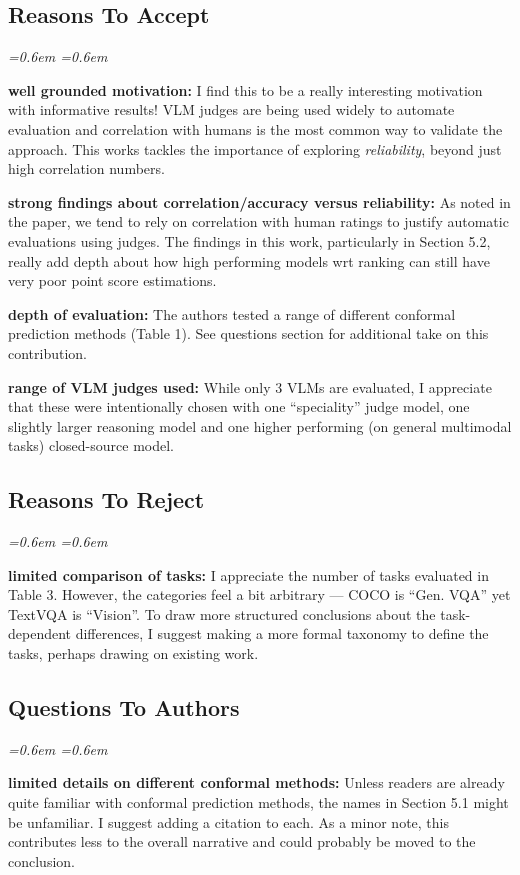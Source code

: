 \documentclass[10pt]{article}
\newenvironment{reviewerquote}{%
  \par\addvspace{0.25ex}\begingroup
  \footnotesize\itshape
  \leftskip=0.6em \rightskip=0.6em
  \color{black!78}
  \setlength{\parskip}{0.35ex plus 0.1ex}
}{%
  \endgroup\par\addvspace{0.25ex}
}
\begin{document}
\subsection*{Reasons To Accept}
\begin{reviewerquote}
\textbf{well grounded motivation:} I find this to be a really interesting motivation with informative results! VLM judges are being used widely to automate evaluation and correlation with humans is the most common way to validate the approach. This works tackles the importance of exploring \emph{reliability}, beyond just high correlation numbers.

\textbf{strong findings about correlation/accuracy versus reliability:} As noted in the paper, we tend to rely on correlation with human ratings to justify automatic evaluations using judges. The findings in this work, particularly in Section 5.2, really add depth about how high performing models wrt ranking can still have very poor point score estimations.

\textbf{depth of evaluation:} The authors tested a range of different conformal prediction methods (Table 1). See questions section for additional take on this contribution.

\textbf{range of VLM judges used:} While only 3 VLMs are evaluated, I appreciate that these were intentionally chosen with one ``speciality'' judge model, one slightly larger reasoning model and one higher performing (on general multimodal tasks) closed-source model.
\end{reviewerquote}

\subsection*{Reasons To Reject}
\begin{reviewerquote}
\textbf{limited comparison of tasks:} I appreciate the number of tasks evaluated in Table 3. However, the categories feel a bit arbitrary --- COCO is ``Gen. VQA'' yet TextVQA is ``Vision''. To draw more structured conclusions about the task-dependent differences, I suggest making a more formal taxonomy to define the tasks, perhaps drawing on existing work.
\end{reviewerquote}

\subsection*{Questions To Authors}
\begin{reviewerquote}
\textbf{limited details on different conformal methods:} Unless readers are already quite familiar with conformal prediction methods, the names in Section 5.1 might be unfamiliar. I suggest adding a citation to each. As a minor note, this contributes less to the overall narrative and could probably be moved to the conclusion.
\end{reviewerquote}
\end{document}
